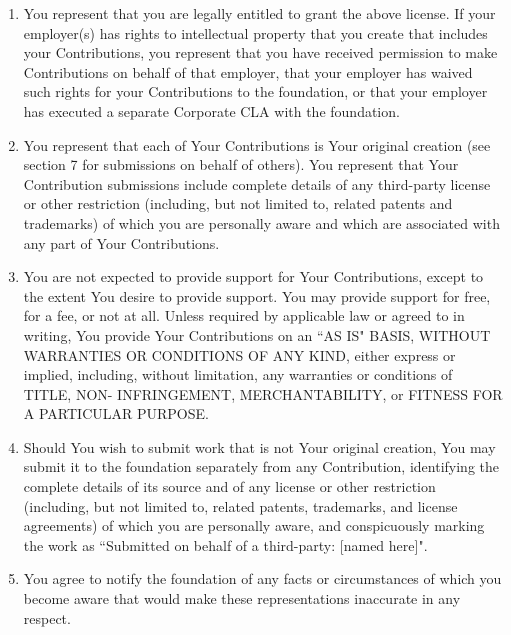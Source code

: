 \documentclass[a4paper]{article}
\begin{document}
\begin{enumerate}
\item You represent that you are legally entitled to grant the above license. If your employer(s) has rights to intellectual property that you create that includes your Contributions, you represent that you have received permission to make Contributions on behalf of that employer, that your employer has waived such rights for your Contributions to the foundation, or that your employer has executed a separate Corporate CLA with the foundation.
\item You represent that each of Your Contributions is Your original creation (see section 7 for submissions on behalf of others). You represent that Your Contribution submissions include complete details of any third-party license or other restriction (including, but not limited to, related patents and trademarks) of which you are personally aware and which are associated with any part of Your Contributions.
\item You are not expected to provide support for Your Contributions, except to the extent You desire to provide support. You may provide support for free, for a fee, or not at all. Unless required by applicable law or agreed to in writing, You provide Your Contributions on an ``AS IS" BASIS, WITHOUT WARRANTIES OR CONDITIONS OF ANY KIND, either express or implied, including, without limitation, any warranties or conditions of TITLE, NON- INFRINGEMENT, MERCHANTABILITY, or FITNESS FOR A PARTICULAR PURPOSE.
\item Should You wish to submit work that is not Your original creation, You may submit it to the foundation separately from any Contribution, identifying the complete details of its source and of any license or other restriction (including, but not limited to, related patents, trademarks, and license agreements) of which you are personally aware, and conspicuously marking the work as ``Submitted on behalf of a third-party: [named here]".
\item You agree to notify the foundation of any facts or circumstances of which you become aware that would make these representations inaccurate in any respect.
\end{enumerate}
\end{document}
